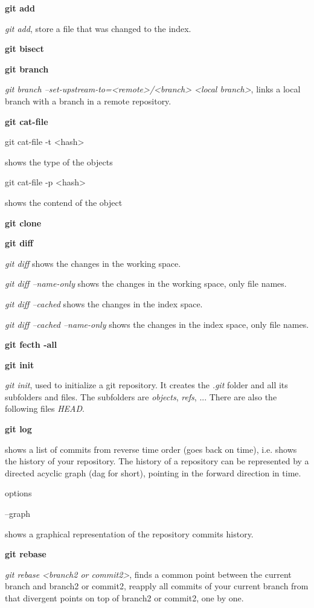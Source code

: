 \textbf{git add}

\noindent \emph{git add}, store a file that was changed to the index.


\noindent \textbf{git bisect}

\noindent \textbf{git branch}

\noindent \emph{git branch --set-upstream-to=<remote>/<branch> <local branch>}, links a local branch with a branch in a remote repository.


\textbf{git cat-file}

git cat-file -t <hash>

shows the type of the objects

git cat-file -p <hash>

shows the contend of the object

\textbf{git clone}

\textbf{git diff}

\emph{git diff} shows the changes in the working space.

\emph{git diff --name-only} shows the changes in the working space, only file names.

\emph{git diff --cached} shows the changes in the index space.

\emph{git diff --cached --name-only} shows the changes in the index space, only file names.

\textbf{git fecth -all}


\noindent \textbf{git init}

\emph{git init}, used to initialize a git repository. It creates the \emph{.git} folder and all its subfolders and files.
The subfolders are \emph{objects}, \emph{refs}, ... There are also the following files \emph{HEAD}.

\textbf{git log}

shows a list of commits from reverse time order (goes back on time), i.e. shows the history of your repository. The history of a repository can be represented by a directed acyclic graph (dag for short), pointing in the forward direction in time.

options

--graph

 shows a graphical representation of the repository commits history.

\noindent \textbf{git rebase}

\emph{git rebase <branch2 or commit2>}, finds a common point between the current branch and branch2 or commit2, reapply all commits of your current branch from that divergent points on top of branch2 or commit2, one by one.

